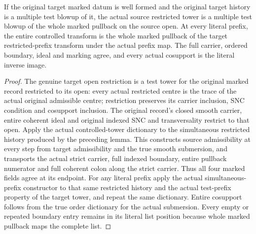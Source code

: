 \begin{lemma}
\label{hir:historical-control-open-record}
\leanok
If the original target marked datum is well formed and the original target history is a multiple test blowup of it, the actual source restricted tower is a multiple test blowup of the whole marked pullback on the source open. At every literal prefix, the entire controlled transform is the whole marked pullback of the target restricted-prefix transform under the actual prefix map. The full carrier, ordered boundary, ideal and marking agree, and every actual cosupport is the literal inverse image.
\end{lemma}
\begin{proof}
The genuine target open restriction is a test tower for the original marked record restricted to its open: every actual restricted centre is the trace of the actual original admissible centre; restriction preserves its carrier inclusion, SNC condition and cosupport inclusion. The original record's closed smooth carrier, entire coherent ideal and original indexed SNC and transversality restrict to that open. Apply the actual controlled-tower dictionary to the simultaneous restricted history produced by the preceding lemma. This constructs source admissibility at every step from target admissibility and the true smooth submersion, and transports the actual strict carrier, full indexed boundary, entire pullback numerator and full coherent colon along the strict carrier. Thus all four marked fields agree at its endpoint. For any literal prefix apply the actual simultaneous-prefix constructor to that same restricted history and the actual test-prefix property of the target tower, and repeat the same dictionary. Entire cosupport follows from the true order dictionary for the actual submersion. Every empty or repeated boundary entry remains in its literal list position because whole marked pullback maps the complete list.
\end{proof}

